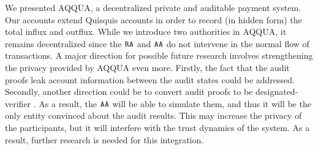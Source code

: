 We presented AQQUA, a decentralized private and auditable payment system. 
Our accounts extend Quisquis accounts in order to record (in hidden form) the total influx and outflux.
While we introduce two authorities in AQQUA, it remains decentralized since the $\RA$ and $\AA$ do not intervene in the normal flow of transactions.
A major direction for possible future research involves strengthening the privacy provided by AQQUA even more.
Firstly, the fact that the audit proofs leak account information between the audit states could be addressed. 
Secondly, another direction could be to convert audit proofs to be designated-verifier \cite{DVP}.
As a result, the $\AA$ will be able to simulate them, and thus it will be the only entity convinced about the audit results. 
This may increase the privacy of the participants, but it will interfere with the trust dynamics of the system. 
As a result, further research is needed for this integration.


